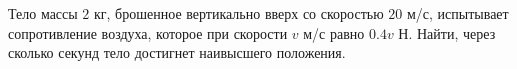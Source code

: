 Тело массы $2$ кг, брошенное вертикально вверх со скоростью $20$ м/с,
испытывает сопротивление воздуха, которое при скорости $v$ м/с равно
$0.4v$ Н. Найти, через сколько секунд тело достигнет наивысшего
положения.
